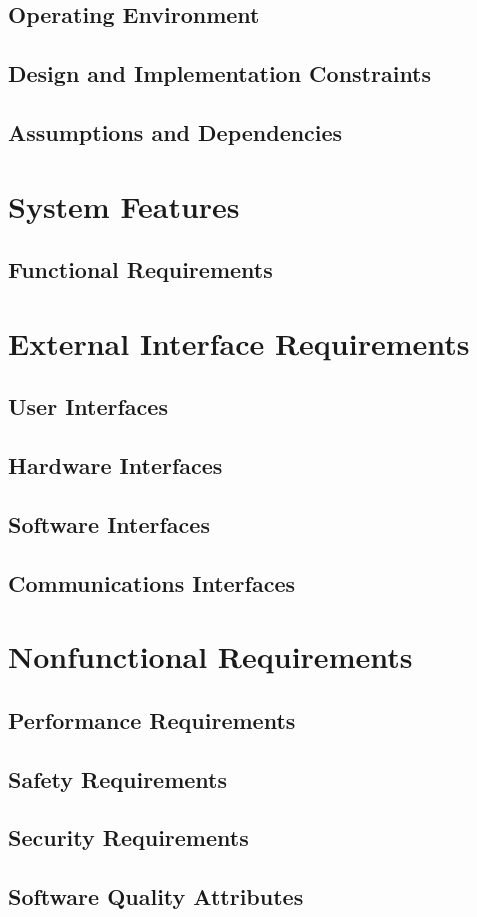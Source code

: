 \documentclass{article}
\begin{document}
	\subsection{Operating Environment}
	\subsection{Design and Implementation Constraints}
	\subsection{Assumptions and Dependencies}

\section{System Features}
	\subsection{Functional Requirements}

\section{External Interface Requirements}
	\subsection{User Interfaces}
	\subsection{Hardware Interfaces}
	\subsection{Software Interfaces}
	\subsection{Communications Interfaces}

\section{Nonfunctional Requirements}
	\subsection{Performance Requirements}
	\subsection{Safety Requirements}
	\subsection{Security Requirements}
	\subsection{Software Quality Attributes}
\end{document}
